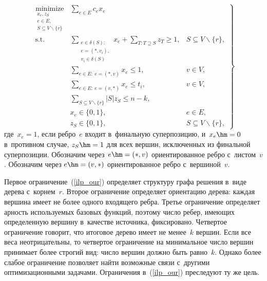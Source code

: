 \begin{multicols}{2}
\noindent
\begin{equation}
\left.
\begin{array}{rll}
\underset{\substack{{x_e, z_S} \\ e\in E,\\ S\subseteq V\backslash 
\{r\}}}{\mbox{minimize}} & \displaystyle \sum\limits_{e\in E}c_ex_e &\\[6pt]
\mbox{s.t.}\ & \displaystyle  \sum\limits_{\substack{{e\in\delta(S):}\\ e=(\ast,v_i),\\ v_i\in\delta(S)}} \!\!\!\! x_e + 
\sum\limits_{T:T\supseteq S}  \!\!\!\! z_T\geqslant 1, & S\subseteq 
V\backslash \{r\},\\[6pt]
& \displaystyle \sum\limits_{e\in E:~e=(\ast,v)} \! x_e\leqslant 1, & v\in V,\\[6pt]
& \displaystyle \sum\limits_{e\in E:~e=(v,\ast)}x_e\leqslant t_i, & v\in V,\\[6pt]
& \displaystyle \sum\limits_{S\subseteq V\backslash \{r\}}|S|z_S \leqslant n-k,\\[6pt]
& x_e\in\{0,1\}, & e\in E,\\[6pt]
& z_S\in\{0,1\}, & S\subseteq V\backslash \{r\},
\end{array}\!
\right\}\!
\label{ilp_our}
\end{equation}
где~$x_e = 1$, если ребро~$e$ входит в~финальную суперпозицию, и~$x_e \hm= 0$ 
в~противном случае, $z_S\hm = 1$ для всех вершин, исключенных из финальной 
суперпозиции. Обозначим через~$e\hm=(\ast, v)$ ориентированное ребро с~листом~$v$. 
Обозначим через $e\hm=(v, \ast)$ ориентированное ребро с~вершиной~$v$.

Первое ограничение~(\ref{ilp_our})  определяет структуру графа решения в~виде 
дерева с~корнем~$r$. Второе ограничение определяет ориентацию дерева: каждая 
вершина имеет не более одного входящего ребра. Третье ограничение определяет 
арность используемых базовых функций, поэтому число ребер, имеющих определенную 
вершину в~качестве источника, фиксировано. Четвертое ограничение говорит, что 
итоговое дерево имеет не менее~$k$ вершин. Если все веса неотрицательны, то 
четвертое ограничение на минимальное число вершин принимает более строгий вид: 
число вершин должно быть равно~$k$. Однако более слабое ограничение позволяет 
найти возможные связи с~другими оптимизационными задачами. Ограничения 
в~(\ref{ilp_our}) преследуют ту же цель.

\vspace*{-9pt}


\end{multicols}
